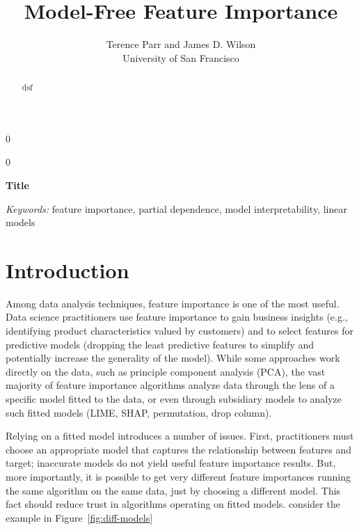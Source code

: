 \documentclass[12pt]{article}
\newcommand{\blind}{0}
\newcommand{\figref}[1]{Figure~\ref{#1}}
\begin{document}
\def\spacingset#1{\renewcommand{\baselinestretch}%
{#1}\small\normalsize} \spacingset{1}



\blind
{
  \title{\bf Model-Free Feature Importance}

  \author{Terence Parr and James D. Wilson\\
      University of San Francisco\\
}
  \maketitle
} \fi

\blind
{
  \bigskip
  \bigskip
  \bigskip
  \begin{center}
    {\LARGE\bf Title}
\end{center}
  \medskip
} \fi

\bigskip
\begin{abstract}
dsf
\end{abstract}

\noindent%
{\it Keywords:} feature importance, partial dependence, model interpretability, linear models

\section{Introduction}
\label{sec:intro}

Among data analysis techniques, feature importance is one of the most  useful. Data science practitioners use feature importance to gain business insights (e.g., identifying product characteristics valued by customers) and to select features for predictive models (dropping the least predictive features to simplify and potentially increase the generality of the model). While some approaches work directly on the data, such as principle component analysis (PCA), the vast majority of feature importance algorithms analyze data through the lens of a specific model fitted to the data, or even through subsidiary models to analyze such fitted models (LIME, SHAP, permutation, drop column).

Relying on a fitted model introduces a number of issues. First, practitioners must choose an appropriate model that captures the relationship between features and target; inaccurate models do not yield useful feature importance results. But, more importantly, it is possible to get very different feature importances running the same algorithm on the same data, just by choosing a different model. This fact should reduce trust in algorithms operating on fitted models. consider the example in \figref{fig:diff-models}
\end{document}

